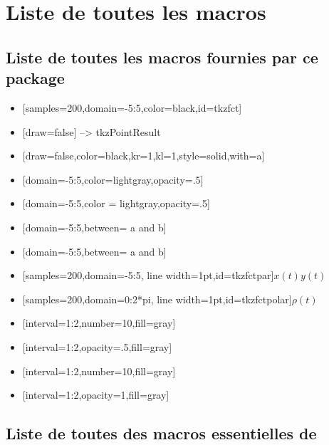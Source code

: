 \section{Liste de toutes les macros}

\subsection{Liste de toutes les macros fournies par ce package}

\begin{itemize}
\item {}[samples=200,domain=-5:5,color=black,id=tkzfct]
\item {}[draw=false] --> tkzPointResult
\item {}[draw=false,color=black,kr=1,kl=1,style=solid,with=a]
\item {}[domain=-5:5,color=lightgray,opacity=.5]
\item {}[domain=-5:5,color = lightgray,opacity=.5]
\item {}[domain=-5:5,between= a and b]
\item {}[domain=-5:5,between= a and b]
\item {}[samples=200,domain=-5:5,
                             line width=1pt,id=tkzfctpar]{$x(t)$}{$y(t)$}
\item {}[samples=200,domain=0:2*pi,
                             line width=1pt,id=tkzfctpolar]{$\rho(t)$}
\item {}[interval=1:2,number=10,fill=gray]
\item {} [interval=1:2,opacity=.5,fill=gray]
\item {} [interval=1:2,number=10,fill=gray]
\item {}[interval=1:2,opacity=1,fill=gray]
\end{itemize}

\subsection{Liste de toutes des macros essentielles de }

